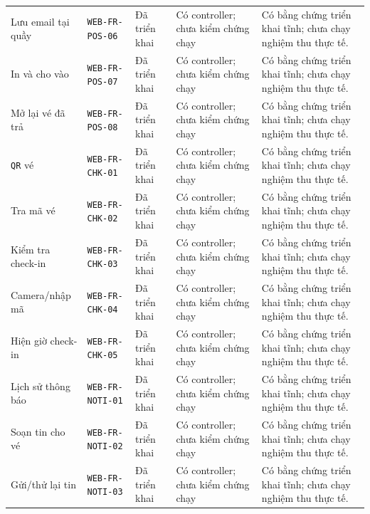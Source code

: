 \begin{longtable}{@{}P{0.19000\SRSWidth}P{0.18000\SRSWidth}P{0.15000\SRSWidth}P{0.20000\SRSWidth}P{0.28000\SRSWidth}@{}}
Lưu email tại quầy & \texttt{WEB-\allowbreak{}FR-\allowbreak{}POS-\allowbreak{}06} & Đã triển khai & Có controller; chưa kiểm chứng chạy & Có bằng chứng triển khai tĩnh; chưa chạy nghiệm thu thực tế. \\[3pt]
In và cho vào & \texttt{WEB-\allowbreak{}FR-\allowbreak{}POS-\allowbreak{}07} & Đã triển khai & Có controller; chưa kiểm chứng chạy & Có bằng chứng triển khai tĩnh; chưa chạy nghiệm thu thực tế. \\[3pt]
Mở lại vé đã trả & \texttt{WEB-\allowbreak{}FR-\allowbreak{}POS-\allowbreak{}08} & Đã triển khai & Có controller; chưa kiểm chứng chạy & Có bằng chứng triển khai tĩnh; chưa chạy nghiệm thu thực tế. \\[3pt]
\texttt{QR} vé & \texttt{WEB-\allowbreak{}FR-\allowbreak{}CHK-\allowbreak{}01} & Đã triển khai & Có controller; chưa kiểm chứng chạy & Có bằng chứng triển khai tĩnh; chưa chạy nghiệm thu thực tế. \\[3pt]
Tra mã vé & \texttt{WEB-\allowbreak{}FR-\allowbreak{}CHK-\allowbreak{}02} & Đã triển khai & Có controller; chưa kiểm chứng chạy & Có bằng chứng triển khai tĩnh; chưa chạy nghiệm thu thực tế. \\[3pt]
Kiểm tra check-in & \texttt{WEB-\allowbreak{}FR-\allowbreak{}CHK-\allowbreak{}03} & Đã triển khai & Có controller; chưa kiểm chứng chạy & Có bằng chứng triển khai tĩnh; chưa chạy nghiệm thu thực tế. \\[3pt]
Camera/\allowbreak{}nhập mã & \texttt{WEB-\allowbreak{}FR-\allowbreak{}CHK-\allowbreak{}04} & Đã triển khai & Có controller; chưa kiểm chứng chạy & Có bằng chứng triển khai tĩnh; chưa chạy nghiệm thu thực tế. \\[3pt]
Hiện giờ check-in & \texttt{WEB-\allowbreak{}FR-\allowbreak{}CHK-\allowbreak{}05} & Đã triển khai & Có controller; chưa kiểm chứng chạy & Có bằng chứng triển khai tĩnh; chưa chạy nghiệm thu thực tế. \\[3pt]
Lịch sử thông báo & \texttt{WEB-\allowbreak{}FR-\allowbreak{}NOTI-\allowbreak{}01} & Đã triển khai & Có controller; chưa kiểm chứng chạy & Có bằng chứng triển khai tĩnh; chưa chạy nghiệm thu thực tế. \\[3pt]
Soạn tin cho vé & \texttt{WEB-\allowbreak{}FR-\allowbreak{}NOTI-\allowbreak{}02} & Đã triển khai & Có controller; chưa kiểm chứng chạy & Có bằng chứng triển khai tĩnh; chưa chạy nghiệm thu thực tế. \\[3pt]
Gửi/\allowbreak{}thử lại tin & \texttt{WEB-\allowbreak{}FR-\allowbreak{}NOTI-\allowbreak{}03} & Đã triển khai & Có controller; chưa kiểm chứng chạy & Có bằng chứng triển khai tĩnh; chưa chạy nghiệm thu thực tế. \\[3pt]

\end{longtable}
